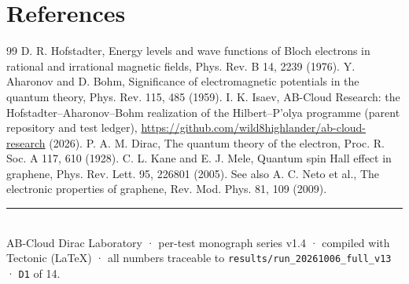 \documentclass[11pt,a4paper]{article}
\begin{document}
\section*{References}
\begin{thebibliography}{99}\small
{} D. R. Hofstadter, Energy levels and wave functions of Bloch electrons in rational and irrational magnetic fields, Phys. Rev. B 14, 2239 (1976).
 Y. Aharonov and D. Bohm, Significance of electromagnetic potentials in the quantum theory, Phys. Rev. 115, 485 (1959).
 I. K. Isaev, AB-Cloud Research: the Hofstadter--Aharonov--Bohm realization of the Hilbert--P'olya programme (parent repository and test ledger), \url{https://github.com/wild8highlander/ab-cloud-research} (2026).
 P. A. M. Dirac, The quantum theory of the electron, Proc. R. Soc. A 117, 610 (1928).
 C. L. Kane and E. J. Mele, Quantum spin Hall effect in graphene, Phys. Rev. Lett. 95, 226801 (2005). See also A. C. Neto et al., The electronic properties of graphene, Rev. Mod. Phys. 81, 109 (2009).
\end{thebibliography}

\vfill
\noindent\rule{\textwidth}{0.4pt}\\[0.2em]
{\footnotesize\color{labgray} AB-Cloud Dirac Laboratory · per-test monograph series v1.4 · compiled with Tectonic (LaTeX) · all numbers traceable to \texttt{results/run\_20261006\_full\_v13} · \texttt{D1} of 14.}
\end{document}

